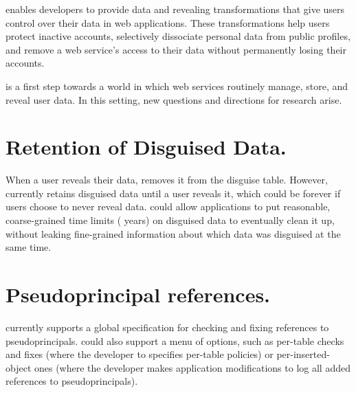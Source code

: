 %
\sys enables developers to provide data \xxing and revealing
transformations that give users control over their data in web applications.
%
These transformations help users protect inactive accounts, selectively dissociate
personal data from public profiles, and remove a web service's access to their
data without permanently losing their accounts.
%


\sys is a first step towards a world in which web services
routinely manage, store, and reveal \xxed user data.
%
In this setting, new questions and directions for research arise.
%

\section{Retention of Disguised Data.}
%
When a user reveals their data, \sys removes it from the disguise table.
%
However, \sys currently retains disguised data until a user reveals it, which
could be forever if users choose to never reveal data.
%
\sys could allow applications to put reasonable,
coarse-grained time limits ( years) on disguised data to eventually clean
it up, without leaking fine-grained information about which data was disguised
at the same time.


\section{Pseudoprincipal references.}
%
\sys currently supports a global specification for checking and fixing references to
pseudoprincipals.
%
\sys could also support a menu of options, such
as per-table checks and fixes (where the developer to specifies per-table
policies) or per-inserted-object ones (where the developer makes application
modifications to log all added references to pseudoprincipals).

